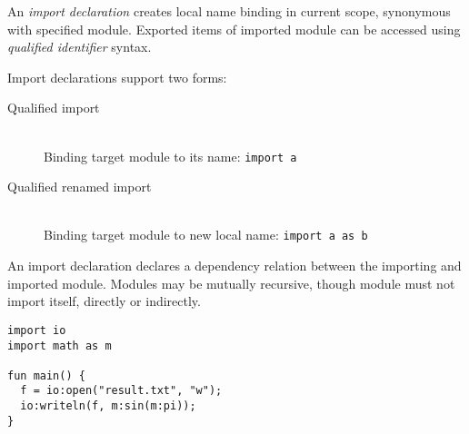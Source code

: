 An \emph{import declaration} creates local name binding in current scope, synonymous with specified module. Exported items of imported module can be accessed using \emph{qualified identifier} syntax.

Import declarations support two forms:

\begin{description}
  \item [Qualified import] \hfill \\
    Binding target module to its name: \lstinline{import a}
  \item [Qualified renamed import] \hfill \\
    Binding target module to new local name: \lstinline{import a as b}
\end{description}

An import declaration declares a dependency relation between the importing and imported module. Modules may be mutually recursive, though module must not import itself, directly or indirectly.

\begin{example}
\begin{lstlisting}
import io
import math as m

fun main() {
  f = io:open("result.txt", "w");
  io:writeln(f, m:sin(m:pi));
}
\end{lstlisting}
\end{example}
